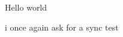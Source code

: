 \documentclass{article}
\begin{document}
    Hello world
    
    i once again ask for a sync test
\end{document}
